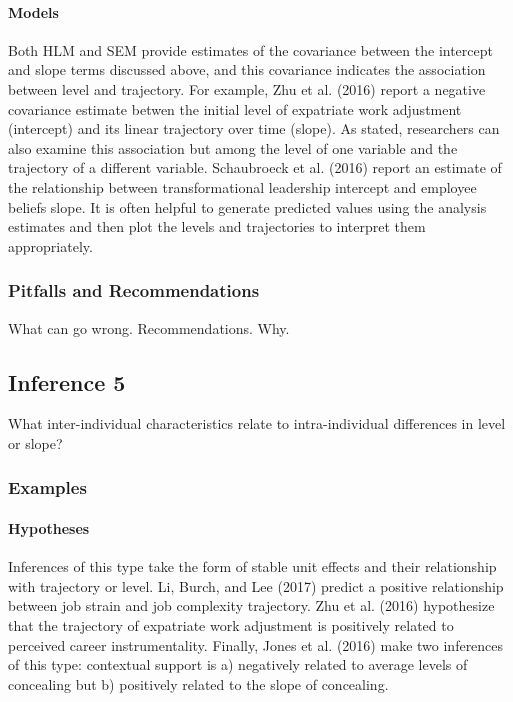 \documentclass[english,,man]{apa6}
\let\oldparagraph\paragraph
\renewcommand{\paragraph}[1]{\oldparagraph{#1}\mbox{}}
\theoremstyle{definition}
\theoremstyle{definition}
\theoremstyle{definition}
\theoremstyle{remark}
\begin{document}
\hypertarget{models-4}{%
\paragraph{Models}\label{models-4}}

Both HLM and SEM provide estimates of the covariance between the
intercept and slope terms discussed above, and this covariance indicates
the association between level and trajectory. For example, Zhu et al.
(2016) report a negative covariance estimate betwen the initial level of
expatriate work adjustment (intercept) and its linear trajectory over
time (slope). As stated, researchers can also examine this association
but among the level of one variable and the trajectory of a different
variable. Schaubroeck et al. (2016) report an estimate of the
relationship between transformational leadership intercept and employee
beliefs slope. It is often helpful to generate predicted values using
the analysis estimates and then plot the levels and trajectories to
interpret them appropriately.

\hypertarget{pitfalls-and-recommendations-4}{%
\subsubsection{Pitfalls and
Recommendations}\label{pitfalls-and-recommendations-4}}

What can go wrong. Recommendations. Why.

\hypertarget{inference-5}{%
\subsection{Inference 5}\label{inference-5}}

What inter-individual characteristics relate to intra-individual
differences in level or slope?

\hypertarget{examples-4}{%
\subsubsection{Examples}\label{examples-4}}

\hypertarget{hypotheses-5}{%
\paragraph{Hypotheses}\label{hypotheses-5}}

Inferences of this type take the form of stable unit effects and their
relationship with trajectory or level. Li, Burch, and Lee (2017) predict
a positive relationship between job strain and job complexity
trajectory. Zhu et al. (2016) hypothesize that the trajectory of
expatriate work adjustment is positively related to perceived career
instrumentality. Finally, Jones et al. (2016) make two inferences of
this type: contextual support is a) negatively related to average levels
of concealing but b) positively related to the slope of concealing.
\end{document}
